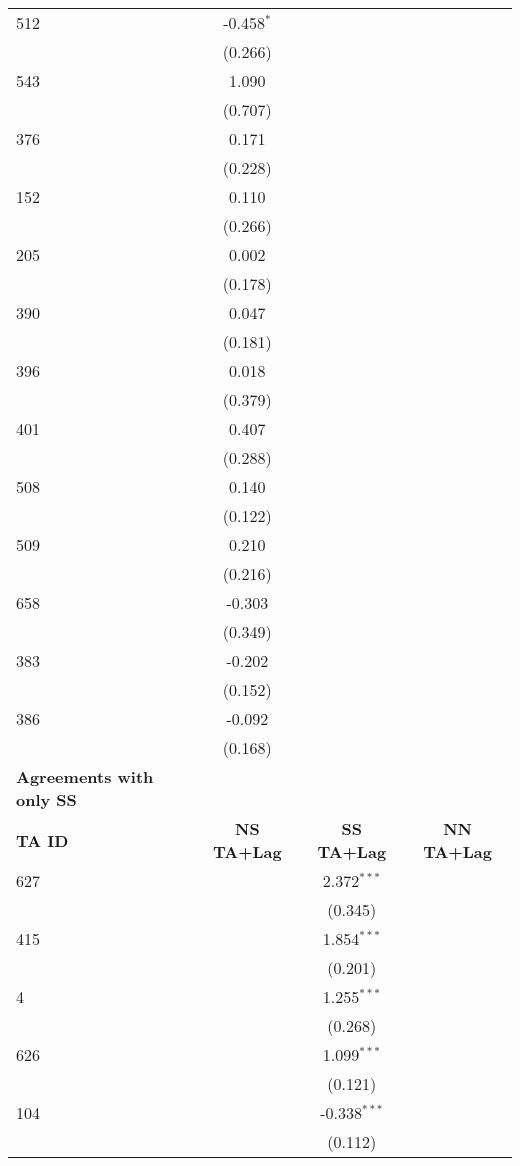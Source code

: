 \begin{center}
\begin{longtable}{lccc}
    512 & -0.458$^{\ast}$ &  &  \\
    & (0.266) &  &  \\
    543 & 1.090 &  &  \\
    & (0.707) &  &  \\
    376 & 0.171 &  &  \\
    & (0.228) &  &  \\
    152 & 0.110 &  &  \\
    & (0.266) &  &  \\
    205 & 0.002 &  &  \\
    & (0.178) &  &  \\
    390 & 0.047 &  &  \\
    & (0.181) &  &  \\
    396 & 0.018 &  &  \\
    & (0.379) &  &  \\
    401 & 0.407 &  &  \\
    & (0.288) &  &  \\
    508 & 0.140 &  &  \\
    & (0.122) &  &  \\
    509 & 0.210 &  &  \\
    & (0.216) &  &  \\
    658 & -0.303 &  &  \\
    & (0.349) &  &  \\
    383 & -0.202 &  &  \\
    & (0.152) &  &  \\
    386 & -0.092 &  &  \\
    & (0.168) &  &  \\
    \hline
    \textbf{Agreements with only SS} &  &  &  \\
    \hline
    \textbf{TA ID} & \textbf{NS TA+Lag} & \textbf{SS TA+Lag} & \textbf{NN TA+Lag} \\
    \hline
    627 &  & 2.372$^{\ast\ast\ast}$ &  \\
    &  & (0.345) &  \\
    415   &  & 1.854$^{\ast\ast\ast}$ &  \\
    &  & (0.201) &  \\
    4   &  & 1.255$^{\ast\ast\ast}$ &  \\
    &  & (0.268) &  \\
    626 &  & 1.099$^{\ast\ast\ast}$ &  \\
    &  & (0.121) &  \\
    104 &  & -0.338$^{\ast\ast\ast}$ &  \\
    &  & (0.112) &  \\

\end{longtable}
\end{center}
